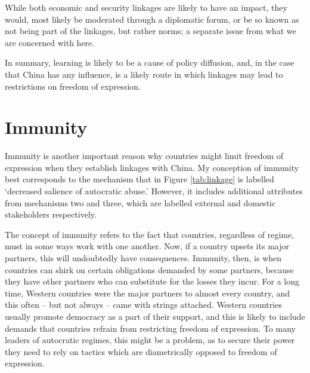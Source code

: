 While both economic and security linkages are likely to have an impact, they would, most likely be moderated through a diplomatic forum, or be so known as not being part of the linkages, but rather norms; a separate issue from what we are concerned with here.

In summary, learning is likely to be a cause of policy diffusion, and, in the case that China has any influence, is a likely route in which linkages may lead to restrictions on freedom of expression.

\section{Immunity}
Immunity is another important reason why countries might limit freedom of expression when they establish linkages with China. My conception of immunity best corresponds to the mechanism that in Figure \ref{tab:linkage} is labelled `decreased salience of autocratic abuse.' However, it includes additional attributes from mechanisms two and three, which are labelled external and domestic stakeholders respectively. 

The concept of immunity refers to the fact that countries, regardless of regime, must in some ways work with one another. Now, if a country upsets its major partners, this will undoubtedly have consequences. Immunity, then, is when countries can shirk on certain obligations demanded by some partners, because they have other partners who can substitute for the losses they incur. For a long time, Western countries were the major partners to almost every country, and this often -- but not always \citep{borzel_noble_2015, wong_chinese_2019} -- came with strings attached. Western countries usually promote democracy as a part of their support, and this is likely to include demands that countries refrain from restricting freedom of expression. To many leaders of autocratic regimes, this might be a problem, as to secure their power they need to rely on tactics which are diametrically opposed to freedom of expression.

